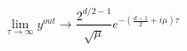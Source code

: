 \begin{equation}
\lim_{\tau\rightarrow
\infty} y^{out}\rightarrow \frac{2^{d/2-1}}{\sqrt{\mu}}
e^{-(\frac{d-1}{2}+i\mu)\tau} 
\end{equation}

